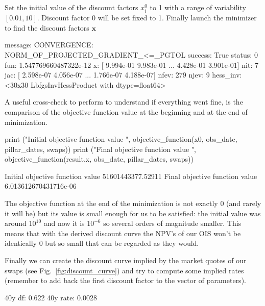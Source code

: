 Set the initial value of the discount factors $x_i^0$ to 1 with a range of variability $[0.01, 10]$. Discount factor 0 will be set fixed to 1.
Finally launch the minimizer to find the discount factors $\mathbf{x}$


\begin{ioutput}
  message: CONVERGENCE: NORM_OF_PROJECTED_GRADIENT_<=_PGTOL
  success: True
   status: 0
      fun: 1.547769660487322e-12
        x: [ 9.994e-01  9.983e-01 ...  4.428e-01  3.901e-01]
      nit: 7
      jac: [ 2.598e-07  4.056e-07 ...  1.766e-07  4.188e-07]
     nfev: 279
     njev: 9
 hess_inv: <30x30 LbfgsInvHessProduct with dtype=float64>
 \end{ioutput}

A useful cross-check to perform to understand if everything went fine, is the comparison of the objective function value at the beginning and at the end of minimization.

\begin{ipythonnon}
print ("Initial objective function value ", objective_function(x0, obs_date, 
                                          pillar_dates, swaps))
print ("Final objective function value ", objective_function(result.x, obs_date,
                                          pillar_dates, swaps))
\end{ipythonnon}
\begin{ioutput}
Initial objective function value  51601443377.52911
Final objective function value  6.013612670431716e-06
\end{ioutput}
The objective function at the end of the minimization is not exactly 0 (and rarely it will be) but its value is small enough for us to be satisfied: the initial value was around $10^{10}$ and now it is $10^{-6}$ so several orders of magnitude smaller. This means that with the derived discount curve the NPV's of our OIS won't be identically 0 but so small that can be regarded as they would.

Finally we can create the discount curve implied by the market quotes of our swaps (see Fig.~\ref{fig:discount_curve}) and try to compute some implied rates (remember to add back the first discount factor to the vector of parameters).

\begin{ioutput}
40y df: 0.622
40y rate: 0.0028
\end{ioutput}

